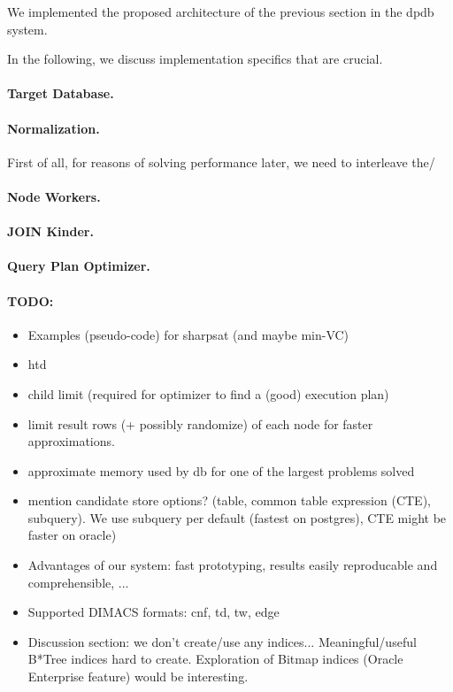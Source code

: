 \documentclass{llncs}
\newcommand{\dpdb}{{\small\textsf{dpdb}}\xspace}
\begin{document}
We implemented the proposed architecture of the previous section in the \dpdb system.

In the following, we discuss implementation specifics that are crucial.

\paragraph*{Target Database.}

\paragraph*{Normalization.}
First of all, for reasons of solving performance later, we need to interleave the/

\paragraph*{Node Workers.}

\paragraph*{JOIN Kinder.}

\paragraph*{Query Plan Optimizer.}

\paragraph*{TODO:}
\begin{itemize}
	\item Examples (pseudo-code) for sharpsat (and maybe min-VC)
	\item htd
	\item child limit (required for optimizer to find a (good) execution plan)
	\item limit result rows (+ possibly randomize) of each node for faster approximations.
	\item approximate memory used by db for one of the largest problems solved
	\item mention candidate store options? (table, common table expression (CTE), subquery). We use subquery per default (fastest on postgres), CTE might be faster on oracle)
	\item Advantages of our system: fast prototyping, results easily reproducable and comprehensible, ...
	\item Supported DIMACS formats: cnf, td, tw, edge
	\item Discussion section: we don't create/use any indices... Meaningful/useful B*Tree indices hard to create. Exploration of Bitmap indices (Oracle Enterprise feature) would be interesting.
\end{itemize}
\end{document}
